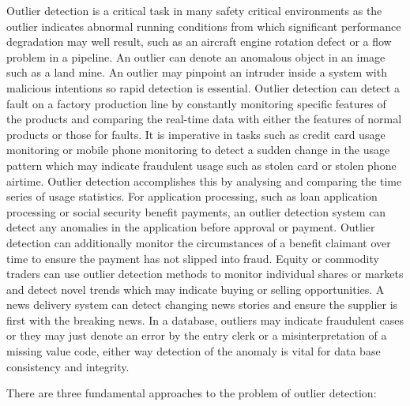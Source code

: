 Outlier detection is a critical task in many safety critical environments as the outlier indicates abnormal running conditions from which significant performance degradation may well result, such as an aircraft engine rotation defect or a flow problem in a pipeline. An outlier can denote an anomalous object in an image such as a land mine. An outlier may pinpoint an intruder inside a system with malicious intentions so rapid detection is essential. Outlier detection can detect a fault on a factory production line by constantly monitoring specific features of the products and comparing the real-time data with either the features of normal products or those for faults. It is imperative in tasks such as credit card usage monitoring or mobile phone monitoring to detect a sudden change in the usage pattern which may indicate fraudulent usage such as stolen card or stolen phone airtime. Outlier detection accomplishes this by analysing and comparing the time series of usage statistics. For application processing, such as loan application processing or social security benefit payments, an outlier detection system can detect any anomalies in the application before approval or payment. Outlier detection can additionally monitor the circumstances of a benefit claimant over time to ensure the payment has not slipped into fraud. Equity or commodity traders can use outlier detection methods to monitor individual shares or markets and detect novel trends which may indicate buying or selling opportunities. A news delivery system can detect changing news stories and ensure the supplier is first with the breaking news. In a database, outliers may indicate fraudulent cases or they may just denote an error by the entry clerk or a misinterpretation of a missing value code, either way detection of the anomaly is vital for data base consistency and integrity.

There are three fundamental approaches to the problem of outlier detection:

